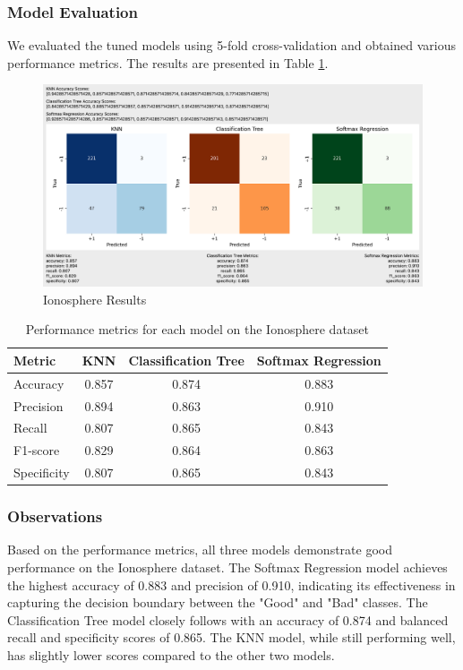 \documentclass[letterpaper,10pt]{article}
\begin{document}
\subsubsection{Model Evaluation}

We evaluated the tuned models using 5-fold cross-validation and obtained various performance metrics. The results are presented in Table \ref{tab:ionosphere_metrics}.

\begin{figure}[ht]
    \centering
    \includegraphics[width=1.0\textwidth]{iono_results.png}
    \caption{Ionosphere Results}
    \label{iono_results}
\end{figure}

\begin{table}[ht]
\centering
\caption{Performance metrics for each model on the Ionosphere dataset}
\label{tab:ionosphere_metrics}
\begin{tabular}{|l|c|c|c|}
\hline
\textbf{Metric} & \textbf{KNN} & \textbf{Classification Tree} & \textbf{Softmax Regression} \\
\hline
Accuracy & 0.857 & 0.874 & 0.883 \\
\hline
Precision & 0.894 & 0.863 & 0.910 \\
\hline
Recall & 0.807 & 0.865 & 0.843 \\
\hline
F1-score & 0.829 & 0.864 & 0.863 \\
\hline
Specificity & 0.807 & 0.865 & 0.843 \\
\hline
\end{tabular}
\end{table}

\subsubsection{Observations}

Based on the performance metrics, all three models demonstrate good performance on the Ionosphere dataset. The Softmax Regression model achieves the highest accuracy of 0.883 and precision of 0.910, indicating its effectiveness in capturing the decision boundary between the "Good" and "Bad" classes. The Classification Tree model closely follows with an accuracy of 0.874 and balanced recall and specificity scores of 0.865. The KNN model, while still performing well, has slightly lower scores compared to the other two models.\par
\end{document}
